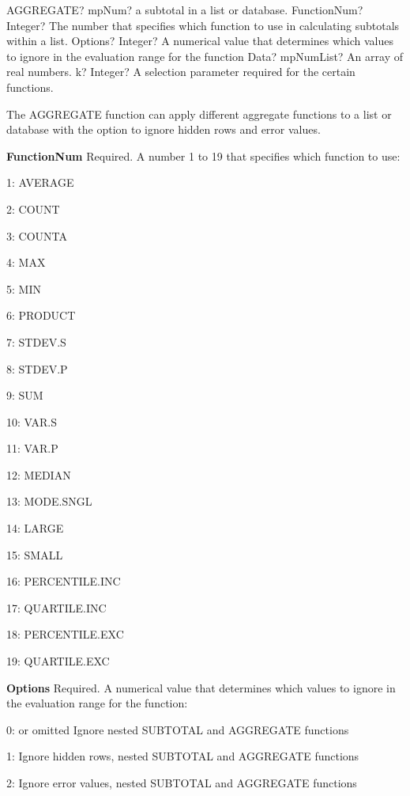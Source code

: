 \begin{mpFunctionsExtract}
	\mpWorksheetFunctionFourNotImplemented
	{AGGREGATE? mpNum? a subtotal in a list or database.}
	{FunctionNum? Integer?  The number that specifies which function to use in calculating subtotals within a list.}
	{Options? Integer?  A numerical value that determines which values to ignore in the evaluation range for the function}
	{Data? mpNumList? An array of real numbers.}
	{k? Integer?  A selection parameter required for the certain functions.}
\end{mpFunctionsExtract}


\vspace{0.3cm}
The AGGREGATE function can apply different aggregate functions to a list or database with the option to ignore hidden rows and error values.

\vspace{0.3cm}
\textsf{\textbf{FunctionNum}}    Required. A number 1 to 19 that specifies which function to use:

1: AVERAGE 

2: COUNT 

3: COUNTA 

4: MAX 

5: MIN 

6: PRODUCT 

7: STDEV.S 

8: STDEV.P 

9: SUM 

10: VAR.S 

11: VAR.P 

12: MEDIAN 

13: MODE.SNGL 

14: LARGE 

15: SMALL 

16: PERCENTILE.INC  

17: QUARTILE.INC 

18: PERCENTILE.EXC 

19: QUARTILE.EXC 

\vspace{0.3cm}
\textsf{\textbf{Options}}     Required. A numerical value that determines which values to ignore in the evaluation range for the function:

0: or omitted Ignore nested SUBTOTAL and AGGREGATE functions  

1: Ignore hidden rows, nested SUBTOTAL and AGGREGATE functions  

2: Ignore error values, nested SUBTOTAL and AGGREGATE functions  

